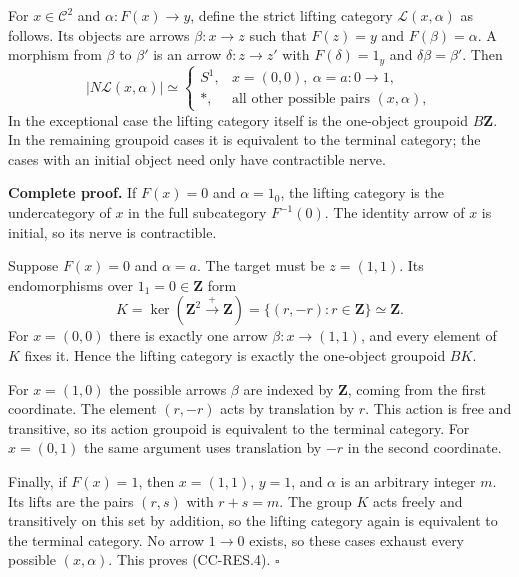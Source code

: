 \documentclass[11pt,a4paper]{article}
\theoremstyle{definition}\newtheorem{definition}[theorem]{Definition}
\theoremstyle{remark}\newtheorem{remark}[theorem]{Remark}
\begin{document}
For \(x\in\mathcal C^2\) and \(\alpha:F(x)\to y\), define the strict
lifting category \(\mathcal L(x,\alpha)\) as follows. Its objects are
arrows \(\beta:x\to z\) such that \(F(z)=y\) and \(F(\beta)=\alpha\). A
morphism from \(\beta\) to \(\beta'\) is an arrow \(\delta:z\to z'\)
with \(F(\delta)=1_y\) and \(\delta\beta=\beta'\). Then \[
|N\mathcal L(x,\alpha)|\simeq
\begin{cases}
S^1,&x=(0,0),\ \alpha=a:0\to1,\\
*,&\text{all other possible pairs }(x,\alpha),
\end{cases}
\tag{CC-RES.4}
\] In the exceptional case the lifting category itself is the one-object
groupoid \(B\mathbf Z\). In the remaining groupoid cases it is
equivalent to the terminal category; the cases with an initial object
need only have contractible nerve.

\textbf{Complete proof.} If \(F(x)=0\) and \(\alpha=1_0\), the lifting
category is the undercategory of \(x\) in the full subcategory
\(F^{-1}(0)\). The identity arrow of \(x\) is initial, so its nerve is
contractible.

Suppose \(F(x)=0\) and \(\alpha=a\). The target must be \(z=(1,1)\). Its
endomorphisms over \(1_1=0\in\mathbf Z\) form \[
K=\ker(\mathbf Z^2\xrightarrow{+}\mathbf Z)
 =\{(r,-r):r\in\mathbf Z\}\simeq\mathbf Z.
\] For \(x=(0,0)\) there is exactly one arrow \(\beta:x\to(1,1)\), and
every element of \(K\) fixes it. Hence the lifting category is exactly
the one-object groupoid \(BK\).

For \(x=(1,0)\) the possible arrows \(\beta\) are indexed by
\(\mathbf Z\), coming from the first coordinate. The element \((r,-r)\)
acts by translation by \(r\). This action is free and transitive, so its
action groupoid is equivalent to the terminal category. For \(x=(0,1)\)
the same argument uses translation by \(-r\) in the second coordinate.

Finally, if \(F(x)=1\), then \(x=(1,1)\), \(y=1\), and \(\alpha\) is an
arbitrary integer \(m\). Its lifts are the pairs \((r,s)\) with
\(r+s=m\). The group \(K\) acts freely and transitively on this set by
addition, so the lifting category again is equivalent to the terminal
category. No arrow \(1\to0\) exists, so these cases exhaust every
possible \((x,\alpha)\). This proves (CC-RES.4). \(\square\)
\end{document}

